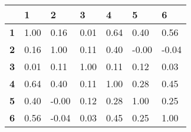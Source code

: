 \begin{tabular}{lllllll}

&\textbf{1}&\textbf{2}&\textbf{3}&\textbf{4}&\textbf{5}&\textbf{6}\\\hline
\textbf{1}&1.00&0.16&0.01&0.64&0.40&0.56\\
\textbf{2}&0.16&1.00&0.11&0.40&-0.00&-0.04\\
\textbf{3}&0.01&0.11&1.00&0.11&0.12&0.03\\
\textbf{4}&0.64&0.40&0.11&1.00&0.28&0.45\\
\textbf{5}&0.40&-0.00&0.12&0.28&1.00&0.25\\
\textbf{6}&0.56&-0.04&0.03&0.45&0.25&1.00\\
\end{tabular}
